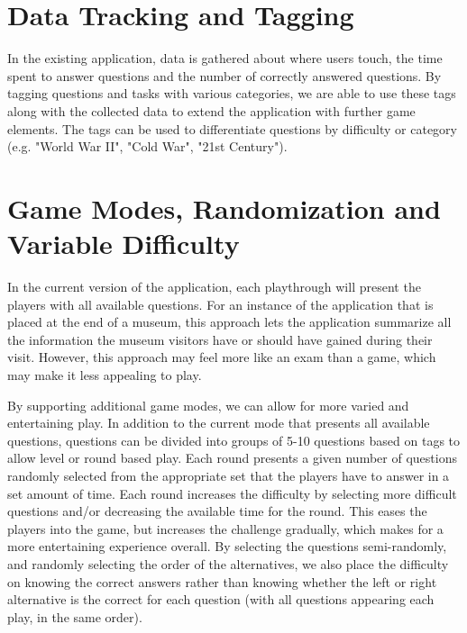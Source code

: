 \section{Data Tracking and Tagging}

In the existing application, data is gathered about where users touch, the time spent to answer questions and the number of correctly answered questions. By tagging questions and tasks with various categories, we are able to use these tags along with the collected data to extend the application with further game elements. The tags can be used to differentiate questions by difficulty or category (e.g. "World War II", "Cold War", "21st Century").


\section{Game Modes, Randomization and Variable Difficulty}

In the current version of the application, each playthrough will present the players with all available questions. For an instance of the application that is placed at the end of a museum, this approach lets the application summarize all the information the museum visitors have or should have gained during their visit. However, this approach may feel more like an exam than a game, which may make it less appealing to play.

By supporting additional game modes, we can allow for more varied and entertaining play. In addition to the current mode that presents all available questions, questions can be divided into groups of 5-10 questions based on tags to allow level or round based play. Each round presents a given number of questions randomly selected from the appropriate set that the players have to answer in a set amount of time. Each round increases the difficulty by selecting more difficult questions and/or decreasing the available time for the round. This eases the players into the game, but increases the challenge gradually, which makes for a more entertaining experience overall. By selecting the questions semi-randomly, and randomly selecting the order of the alternatives, we also place the difficulty on knowing the correct answers rather than knowing whether the left or right alternative is the correct for each question (with all questions appearing each play, in the same order).

